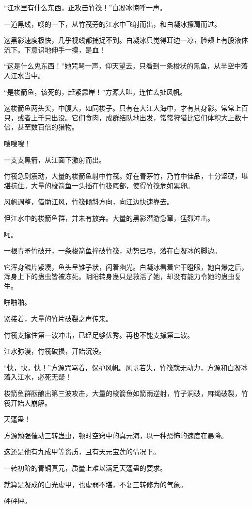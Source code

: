 \begin{this_body}
“江水里有什么东西，正攻击竹筏！”白凝冰惊呼一声。

一道黑线，嗖的一下，从竹筏旁的江水中飞射而出，和白凝冰擦肩而过。

这黑影速度极快，几乎视线都捕捉不到。白凝冰只觉得耳边一凉，脸颊上有股液体流下。下意识地伸手一摸，是血！

“这是什么鬼东西！”她咒骂一声，仰天望去，只看到一条梭状的黑鱼，从半空中落入江水当中。

“是梭箭鱼，该死的，赶紧靠岸！”方源大叫，连忙去扯风帆。

这梭箭鱼两头尖，中腹大，如同梭子。只有在大江大海中，才有其身影。常常上百只，或者上千只出没。它们食肉，成群结队地出发，常常狩猎比它们体积大上数十倍，甚至数百倍的猎物。

嗖嗖嗖！

一支支黑箭，从江面下激射而出。

竹筏急剧震动，大量的梭箭鱼射中竹筏。好在青茅竹，乃竹中佳品，十分坚硬，堪堪抗住。大量的梭箭鱼一头插在竹筏底部，使得竹筏危如累卵。

风帆调整，借助江风，竹筏倾斜方向，向江边快速靠去。

但江水中的梭箭鱼群，并未有放弃。大量的黑影潜游急窜，猛烈冲击。

啪。

一根青矛竹破开，一条梭箭鱼撞破竹筏，动势已尽，落在白凝冰的脚边。

它浑身鳞片紧凑，鱼头呈锥子状，闪着幽光。白凝冰看着它干瞪眼，她自爆之后，浑身上下的蛊虫皆被冻死。阴阳转身蛊只是救活了她，却没有能力令她的蛊虫复生。

啪啪啪。

紧接着，大量的竹片破裂之声传来。

竹筏支撑住第一波冲击，已经足够优秀。再也不能支撑第二波。

江水弥漫，竹筏破损，开始沉没。

“快，快，快！”方源咒骂着，保护风帆。风帆若失，竹筏就无动力，方源和白凝冰落入江水，必死无疑！

梭箭鱼群酝酿出第三波攻击，大量的梭箭鱼如箭雨逆射，竹子洞破，麻绳破裂，竹筏开始大崩解。

天蓬蛊！

方源勉强催动三转蛊虫，顿时空窍中的真元海，以一种恐怖的速度在暴降。

这还是他有九成甲等资质，且有天元宝莲的情况下。

一转初阶的青铜真元，质量上难以满足天蓬蛊的要求。

就算是凝成的白光虚甲，也虚弱不堪，不复三转修为的气象。

砰砰砰。


\end{this_body}
